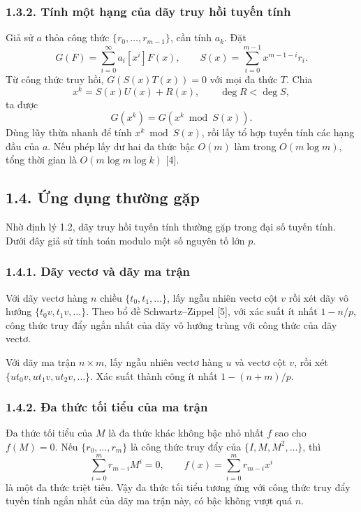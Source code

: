 \documentclass[11pt]{article}
\begin{document}
\subsubsection*{1.3.2. Tính một hạng của dãy truy hồi tuyến tính}

Giả sử \(a\) thỏa công thức \(\{r_0,\ldots,r_{m-1}\}\), cần tính \(a_k\). Đặt
\[
  G(F)=\sum_{i=0}^{\infty}a_i[x^i]F(x),\qquad
  S(x)=\sum_{i=0}^{m-1}x^{m-1-i}r_i.
\]
Từ công thức truy hồi, \(G(S(x)T(x))=0\) với mọi đa thức \(T\). Chia
\[
  x^k=S(x)U(x)+R(x),\qquad \deg R<\deg S,
\]
ta được
\[
  G(x^k)=G(x^k\bmod S(x)).
\]
Dùng lũy thừa nhanh để tính \(x^k\bmod S(x)\), rồi lấy tổ hợp tuyến tính các
hạng đầu của \(a\). Nếu phép lấy dư hai đa thức bậc \(O(m)\) làm trong
\(O(m\log m)\), tổng thời gian là \(O(m\log m\log k)\) [4].

\subsection*{1.4. Ứng dụng thường gặp}

Nhờ định lý 1.2, dãy truy hồi tuyến tính thường gặp trong đại số tuyến tính.
Dưới đây giả sử tính toán modulo một số nguyên tố lớn \(p\).

\subsubsection*{1.4.1. Dãy vectơ và dãy ma trận}

Với dãy vectơ hàng \(n\) chiều \(\{t_0,t_1,\ldots\}\), lấy ngẫu nhiên vectơ
cột \(v\) rồi xét dãy vô hướng \(\{t_0v,t_1v,\ldots\}\). Theo bổ đề
Schwartz--Zippel [5], với xác suất ít nhất \(1-n/p\), công thức truy đẩy ngắn
nhất của dãy vô hướng trùng với công thức của dãy vectơ.

Với dãy ma trận \(n\times m\), lấy ngẫu nhiên vectơ hàng \(u\) và vectơ cột
\(v\), rồi xét \(\{ut_0v,ut_1v,ut_2v,\ldots\}\). Xác suất thành công ít nhất
\(1-(n+m)/p\).

\subsubsection*{1.4.2. Đa thức tối tiểu của ma trận}

Đa thức tối tiểu của \(M\) là đa thức khác không bậc nhỏ nhất \(f\) sao cho
\(f(M)=0\). Nếu \(\{r_0,\ldots,r_m\}\) là công thức truy đẩy của
\(\{I,M,M^2,\ldots\}\), thì
\[
  \sum_{i=0}^{m}r_{m-i}M^i=0,\qquad
  f(x)=\sum_{i=0}^{m}r_{m-i}x^i
\]
là một đa thức triệt tiêu. Vậy đa thức tối tiểu tương ứng với công thức truy
đẩy tuyến tính ngắn nhất của dãy ma trận này, có bậc không vượt quá \(n\).
\end{document}

